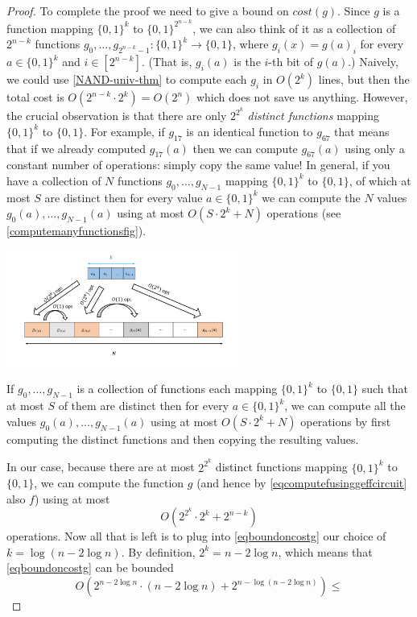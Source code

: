 \begin{proof}
To complete the proof we need to give a bound on \(cost(g)\). Since
\(g\) is a function mapping \(\{0,1\}^k\) to \(\{0,1\}^{2^{n-k}}\), we
can also think of it as a collection of \(2^{n-k}\) functions
\(g_0,\ldots, g_{2^{n-k}-1}: \{0,1\}^k \rightarrow \{0,1\}\), where
\(g_i(x) = g(a)_i\) for every \(a\in \{0,1\}^k\) and \(i\in [2^{n-k}]\).
(That is, \(g_i(a)\) is the \(i\)-th bit of \(g(a)\).) Naively, we could
use \cref{NAND-univ-thm} to compute each \(g_i\) in \(O(2^k)\) lines,
but then the total cost is \(O(2^{n-k} \cdot 2^k) = O(2^n)\) which does
not save us anything. However, the crucial observation is that there are
only \(2^{2^k}\) \emph{distinct functions} mapping \(\{0,1\}^k\) to
\(\{0,1\}\). For example, if \(g_{17}\) is an identical function to
\(g_{67}\) that means that if we already computed \(g_{17}(a)\) then we
can compute \(g_{67}(a)\) using only a constant number of operations:
simply copy the same value! In general, if you have a collection of
\(N\) functions \(g_0,\ldots,g_{N-1}\) mapping \(\{0,1\}^k\) to
\(\{0,1\}\), of which at most \(S\) are distinct then for every value
\(a\in \{0,1\}^k\) we can compute the \(N\) values
\(g_0(a),\ldots,g_{N-1}(a)\) using at most \(O(S\cdot 2^k + N)\)
operations (see \cref{computemanyfunctionsfig}).


\begin{marginfigure}
\centering
\includegraphics[width=\linewidth, height=1.5in, keepaspectratio]{../figure/computemanyfunctions.png}
\caption{If \(g_0,\ldots, g_{N-1}\) is a collection of functions each
mapping \(\{0,1\}^k\) to \(\{0,1\}\) such that at most \(S\) of them are
distinct then for every \(a\in \{0,1\}^k\), we can compute all the
values \(g_0(a),\ldots,g_{N-1}(a)\) using at most \(O(S \cdot 2^k + N)\)
operations by first computing the distinct functions and then copying
the resulting values.}
\label{computemanyfunctionsfig}
\end{marginfigure}

In our case, because there are at most \(2^{2^k}\) distinct functions
mapping \(\{0,1\}^k\) to \(\{0,1\}\), we can compute the function \(g\)
(and hence by \eqref{eqcomputefusinggeffcircuit} also \(f\)) using at
most\\
\[O(2^{2^k} \cdot 2^k + 2^{n-k}) \label{eqboundoncostg}\] operations.
Now all that is left is to plug into \eqref{eqboundoncostg} our choice
of \(k = \log (n-2\log n)\). By definition, \(2^k = n-2\log n\), which
means that \eqref{eqboundoncostg} can be bounded \[
O\left(2^{n-2\log n} \cdot (n-2\log n) +  2^{n-\log(n-2\log n)}\right) \leq
\]


\end{proof}
